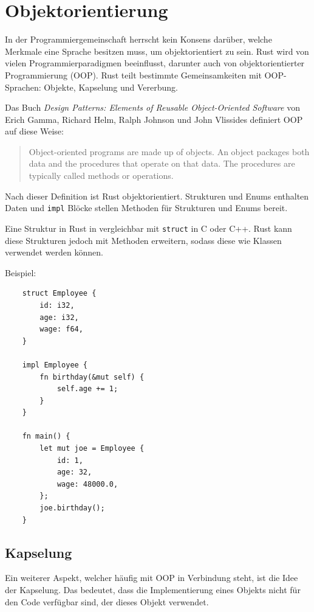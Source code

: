 \section{Objektorientierung}

In der Programmiergemeinschaft herrscht kein Konsens darüber, welche Merkmale eine Sprache besitzen muss, um objektorientiert zu sein. Rust wird von vielen Programmierparadigmen beeinflusst, darunter auch von objektorientierter Programmierung (OOP). Rust teilt bestimmte Gemeinsamkeiten mit OOP-Sprachen: Objekte, Kapselung und Vererbung.

Das Buch \textit{Design Patterns: Elements of Reusable Object-Oriented Software} von Erich Gamma, Richard Helm, Ralph Johnson und John Vlissides definiert OOP auf diese Weise:

\begin{quote}
    Object-oriented programs are made up of objects. An object packages both data and the procedures that operate on that data. The procedures are typically called methods or operations.
\end{quote}

Nach dieser Definition ist Rust objektorientiert. Strukturen und Enums enthalten Daten und \verb"impl" Blöcke stellen Methoden für Strukturen und Enums bereit.

Eine Struktur in Rust in vergleichbar mit \verb"struct" in C oder C++. Rust kann diese Strukturen jedoch mit Methoden erweitern, sodass diese wie Klassen verwendet werden können.

Beispiel:

\begin{lstlisting}
    struct Employee {
        id: i32,
        age: i32,
        wage: f64,
    }
    
    impl Employee {
        fn birthday(&mut self) {
            self.age += 1;
        }
    }
    
    fn main() {
        let mut joe = Employee {
            id: 1,
            age: 32,
            wage: 48000.0,
        };
        joe.birthday();
    }
\end{lstlisting}

\subsection{Kapselung}

Ein weiterer Aspekt, welcher häufig mit OOP in Verbindung steht, ist die Idee der Kapselung. Das bedeutet, dass die Implementierung eines Objekts nicht für den Code verfügbar sind, der dieses Objekt verwendet.

